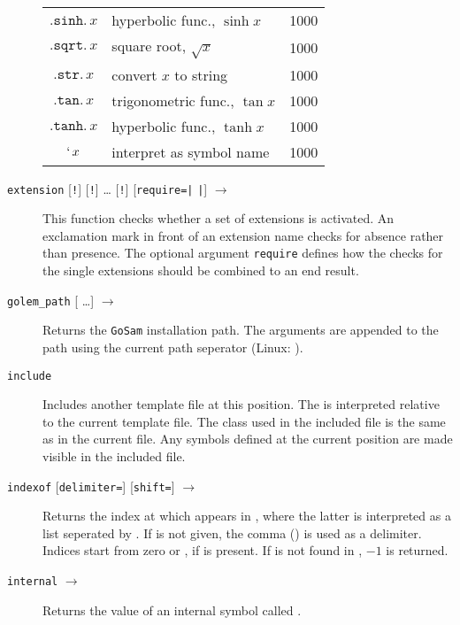 \documentclass[11pt,a4paper]{refrep}
\newcommand{\golem}{{\tt GoSam}\xspace}
\begin{document}
\begin{description}
\begin{center}
\begin{longtable}{|c|p{12em}|r|}
   $\mathtt{.sinh.}\,x$ & hyperbolic func., $\sinh x$ & 1000\\
   $\mathtt{.sqrt.}\,x$ & square root, $\sqrt{x}$ & 1000\\
   $\mathtt{.str.}\,x$ & convert $x$ to string & 1000\\
   $\mathtt{.tan.}\,x$ & trigonometric func., $\tan x$ & 1000\\
   $\mathtt{.tanh.}\,x$ & hyperbolic func., $\tanh x$ & 1000\\
   $\mathtt{`}\,x$ & interpret as symbol name & 1000\\
   \end{longtable}
   \end{center}
\item[\texttt{extension} {[\texttt{!}]}\synt{name$_1$} 
   {[\texttt{!}]}\synt{name$_2$} \dots
   {[\texttt{!}]}\synt{name$_n$} {[\texttt{require=}\lit{all}\texttt{|}%
\lit{any}\texttt{|}\lit{no}]} $\to$ \synt{logical}]
   This function checks whether a set of extensions is activated.
   An exclamation mark in front of an extension name checks for absence
   rather than presence. The optional argument \texttt{require}
   defines how the checks for the single extensions should be combined
   to an end result.
\item[\texttt{golem\_path} {[\synt{arg$_1$} \ldots \synt{arg$_n$}]} $\to$
   \synt{string}]
   Returns the \golem{} installation path. The arguments are appended to
   the path using the current path seperator (Linux: \lit{/}).
\item[\texttt{include} \synt{file-name}] Includes another template file
   at this position. The  is interpreted relative to the
   current template file. The class used in the included file is the same
   as in the current file. Any symbols defined at the current position
   are made visible in the included file.
\item[\texttt{indexof} \synt{needle} \synt{haystack}
   {[\texttt{delimiter=}\synt{delimiter}]}
   {[\texttt{shift=}\synt{shift}]} $\to$ \synt{integer}]
   Returns the index at which  appears in ,
   where the latter is interpreted as a list seperated by .
   If  is not given, the comma (\lit{,}) is used as a
   delimiter. Indices start from zero or , if  is
   present. If  is not found in , $-1$ is
   returned.
\item[\texttt{internal} \synt{name} $\to$ \synt{string}]
   Returns the value of an internal symbol called .

\end{description}
\end{document}
